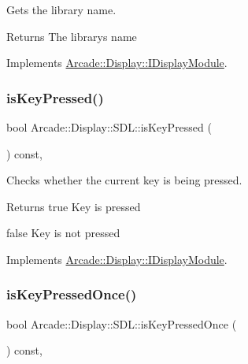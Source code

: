 Gets the library name. 

\begin{DoxyReturn}{Returns}
The library\textquotesingle{}s name 
\end{DoxyReturn}


Implements \mbox{\hyperlink{classArcade_1_1Display_1_1IDisplayModule_a0d8e957815e94766bdefbd7a5043e81a}{Arcade\+::\+Display\+::\+I\+Display\+Module}}.

\mbox{\label{classArcade_1_1Display_1_1SDL_a375ea86360c510415d86a198f5cd3e30}} 
\subsubsection{\texorpdfstring{isKeyPressed()}{isKeyPressed()}}
{\footnotesize\ttfamily bool Arcade\+::\+Display\+::\+S\+D\+L\+::is\+Key\+Pressed (\begin{DoxyParamCaption}\item[{\mbox{\hyperlink{classArcade_1_1Display_1_1IDisplayModule_a8da3f6b309ca0581473ae8cc8789b619}{I\+Display\+Module\+::\+Keys}}}]{ }\end{DoxyParamCaption}) const\hspace{0.3cm}{\ttfamily [final]}, {\ttfamily [virtual]}}



Checks whether the current key is being pressed. 

\begin{DoxyReturn}{Returns}
true Key is pressed 

false Key is not pressed 
\end{DoxyReturn}


Implements \mbox{\hyperlink{classArcade_1_1Display_1_1IDisplayModule_ab3d02b76c08ff2deb728dc9f0d557f43}{Arcade\+::\+Display\+::\+I\+Display\+Module}}.

\mbox{\label{classArcade_1_1Display_1_1SDL_a883547b9f495cdf800225bc32b0ffe40}} 
\subsubsection{\texorpdfstring{isKeyPressedOnce()}{isKeyPressedOnce()}}
{\footnotesize\ttfamily bool Arcade\+::\+Display\+::\+S\+D\+L\+::is\+Key\+Pressed\+Once (\begin{DoxyParamCaption}\item[{\mbox{\hyperlink{classArcade_1_1Display_1_1IDisplayModule_a8da3f6b309ca0581473ae8cc8789b619}{I\+Display\+Module\+::\+Keys}}}]{ }\end{DoxyParamCaption}) const\hspace{0.3cm}{\ttfamily [final]}, {\ttfamily [virtual]}}



